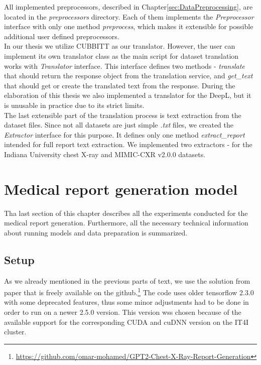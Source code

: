 All implemented preprocessors, described in Chapter\ref{sec:DataPreprocessing}, are located in the \textit{preprocessors} directory. Each of them implements the  \textit{Preprocessor} interface with only one method \textit{preprocess}, which makes it extensible for possible additional user defined preprocessors.\\

In our thesis we utilize CUBBITT as our translator. However, the user can implement its own translator class as the main script for dataset translation works with \textit{Translator} interface. This interface defines two methods - \textit{translate} that should return the response object from the translation service, and \textit{get\_text} that should get or create the translated text from the response. During the elaboration of this thesis we also implemented a translator for the DeepL, but it is unusable in practice due to its strict limits.\\

The last extensible part of the translation process is text extraction from the dataset files. Since not all datasets are just simple \textit{.txt} files, we created the \textit{Extractor} interface for this purpose. It defines only one method \textit{extract\_report} intended for full report text extraction. We implemented two extractors - for the Indiana University chest X-ray and MIMIC-CXR v2.0.0 datasets.

\section{Medical report generation model}
Tha last section of this chapter describes all the experiments conducted for the medical report generation. Furthermore, all the necessary technical information about running models and data preparation is summarized.

\subsection{Setup}
As we already mentioned in the previous parts of text, we use the solution from \citet{alfarghaly2021automated} paper that is freely available on the github.\footnote[8]{\url{https://github.com/omar-mohamed/GPT2-Chest-X-Ray-Report-Generation}} The code uses older tensorflow 2.3.0 with some deprecated features, thus some minor adjustments had to be done in order to run on a newer 2.5.0 version. This version wss chosen because of the available support for the corresponding CUDA and cuDNN version on the IT4I cluster. \\

